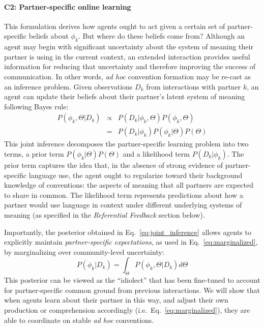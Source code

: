 \paragraph{C2: Partner-specific online learning}


This formulation derives how agents ought to act given a certain set of partner-specific beliefs about $\phi_k$.
But where do these beliefs come from?
Although an agent may begin with significant uncertainty about the system of meaning their partner is using in the current context, an extended interaction provides useful information for reducing that uncertainty and therefore improving the success of communication.
In other words, \emph{ad hoc} convention formation may be re-cast as an inference problem.
Given observations $D_k$ from interactions with partner $k$, an agent can update their beliefs about their partner's latent system of meaning following Bayes rule:
\begin{equation}
\begin{array}{rcl}
\label{eq:joint_inference}
P(\phi_k, \Theta | D_k)  & \propto &  P(D_k | \phi_k, \Theta) P(\phi_k, \Theta) \\
                           & =   & P(D_k | \phi_k) P(\phi_k | \Theta) P(\Theta)
\end{array}
\end{equation}
This joint inference decomposes the partner-specific learning problem into two terms, a prior term $P(\phi_k | \Theta)P(\Theta)$ and a likelihood term $P(D_k | \phi_k)$.
The prior term captures the idea that, in the absence of strong evidence of partner-specific language use, the agent ought to regularize toward their background knowledge of conventions: the aspects of meaning that all partners are expected to share in common.
The likelihood term represents predictions about how a partner would use language in context under different underlying systems of meaning (as specified in the \emph{Referential Feedback} section below).

Importantly, the posterior obtained in Eq.~\ref{eq:joint_inference} allows agents to explicitly maintain \emph{partner-specific expectations}, as used in Eq.~\ref{eq:marginalized}, by marginalizing over community-level uncertainty:
\begin{equation}
P(\phi_k | D_k) =  \int_{\Theta}P(\phi_k, \Theta | D_k)  d\Theta
\end{equation}
This posterior can be viewed as the ``idiolect'' that has been fine-tuned to account for partner-specific common ground from previous interactions.
We will show that when agents learn about their partner in this way, and adjust their own production or comprehension accordingly (i.e.~Eq.~\ref{eq:marginalized}), they are able to coordinate on stable \emph{ad hoc} conventions.

